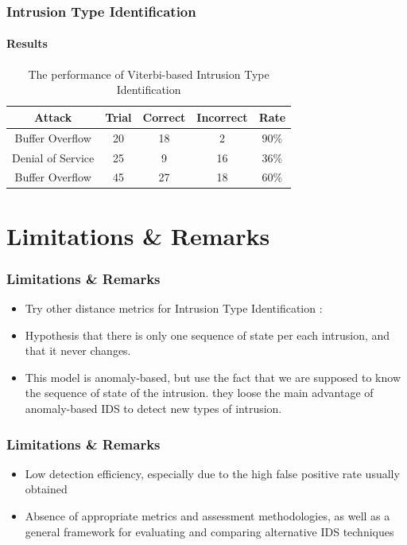 \documentclass{beamer}
\begin{document}
\begin{frame}
  \frametitle{Intrusion Type Identification}
  \framesubtitle{Results}
  \begin{table}[h]
    \centering
    \caption{\label{tab:IDS}The performance of Viterbi-based Intrusion
      Type Identification}
    \begin{tabular}{|c| c|c | c | c |}
      \hline
      Attack & Trial & Correct & Incorrect & Rate \\ \hline
      Buffer Overflow & 20 & 18 & 2 & 90\% \\ \hline
      Denial of Service & 25 & 9 & 16 & 36\% \\ \hline
      Buffer Overflow & 45 & 27 & 18 & 60\% \\ \hline
    \end{tabular}
  \end{table}    
\end{frame}

\section{Limitations \& Remarks}
\begin{frame}
  \frametitle{Limitations \& Remarks}
  \begin{itemize}[label=$\square$]
  \item Try other distance metrics for Intrusion Type Identification :
    \pause
  \item Hypothesis that there is only one sequence of state per each intrusion, 
    and that it never changes.\pause
  \item This model is anomaly-based, but use the fact that we are supposed to 
    know the sequence of state of the intrusion. they loose the main advantage 
    of anomaly-based IDS to detect new types of intrusion.
  \end{itemize}
\end{frame}

\begin{frame}
  \frametitle{Limitations \& Remarks}
  \begin{itemize}[label=$\square$]
  \item  Low detection efficiency, especially due to the high false positive 
    rate usually obtained \pause
  \item Absence of appropriate metrics and assessment methodologies, as well as 
    a general framework for evaluating and comparing alternative IDS techniques
  \end{itemize}
\end{frame}
\end{document}
